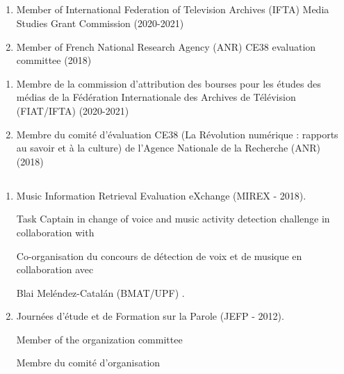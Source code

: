 \subsection{\EvalProj}

\begin{en}
\begin{enumerate}
\item Member of International Federation of Television Archives (IFTA) Media Studies Grant Commission (2020-2021)
\item Member of French National Research Agency (ANR) CE38 evaluation committee (2018)
\end{enumerate}
\end{en}

\begin{fr}
\begin{enumerate}
\item Membre de la commission d'attribution des bourses pour les études des médias de la Fédération Internationale des Archives de Télévision (FIAT/IFTA) (2020-2021)
\item Membre du comité d'évaluation CE38 (La Révolution numérique : rapports au savoir et à la culture) de l'Agence Nationale de la Recherche (ANR) (2018)
\end{enumerate}
\end{fr}

\subsection{\EvalAnim}
\begin{enumerate}
\item Music Information Retrieval Evaluation eXchange (MIREX - 2018).
\begin{en}Task Captain in change of voice and music activity detection challenge in collaboration with\end{en}
\begin{fr}
Co-organisation du concours de détection de voix et de musique en collaboration avec
\end{fr}
Blai Meléndez-Catalán (BMAT/UPF) .
\item Journées d’étude et de Formation sur la Parole (JEFP - 2012).
\begin{en}Member of the organization committee \end{en}
\begin{fr}Membre du comité d'organisation \end{fr}
\end{enumerate}






